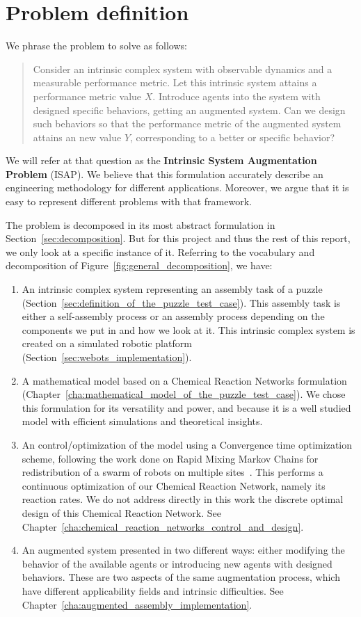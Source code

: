 \section{Problem definition} %
\label{sec:problem_definition}
We phrase the problem to solve as follows:

\begin{quote}
Consider an intrinsic complex system with observable dynamics and a measurable performance metric. Let this intrinsic system attains a performance metric value $X$. Introduce agents into the system with designed specific behaviors, getting an augmented system. Can we design such behaviors so that the performance metric of the augmented system attains an new value $Y$, corresponding to a better or specific behavior?
\end{quote}

We will refer at that question as the \textbf{Intrinsic System Augmentation Problem} (ISAP). We believe that this formulation accurately describe an engineering methodology for different applications. Moreover, we argue that it is easy to represent different problems with that framework.

The problem is decomposed in its most abstract formulation in Section~\ref{sec:decomposition}. But for this project and thus the rest of this report, we only look at a specific instance of it. Referring to the vocabulary and decomposition of Figure~\ref{fig:general_decomposition}, we have:
\begin{enumerate}
	\item An intrinsic complex system representing an assembly task of a puzzle (Section~\ref{sec:definition_of_the_puzzle_test_case}). This assembly task is either a self-assembly process or an assembly process depending on the components we put in and how we look at it. This intrinsic complex system is created on a simulated robotic platform (Section~\ref{sec:webots_implementation}).
	\item A mathematical model based on a Chemical Reaction Networks formulation (Chapter~\ref{cha:mathematical_model_of_the_puzzle_test_case}). We chose this formulation for its versatility and power, and because it is a well studied model with efficient simulations and theoretical insights.
	\item An control/optimization of the model using a Convergence time optimization scheme, following the work done on Rapid Mixing Markov Chains for redistribution of a swarm of robots on multiple sites~\cite{ref:BermanTRO08}. This performs a continuous optimization of our Chemical Reaction Network, namely its reaction rates. We do not address directly in this work the discrete optimal design of this Chemical Reaction Network. See Chapter~\ref{cha:chemical_reaction_networks_control_and_design}.
	\item An augmented system presented in two different ways: either modifying the behavior of the available agents or introducing new agents with designed behaviors. These are two aspects of the same augmentation process, which have different applicability fields and intrinsic difficulties. See Chapter~\ref{cha:augmented_assembly_implementation}.
\end{enumerate}

